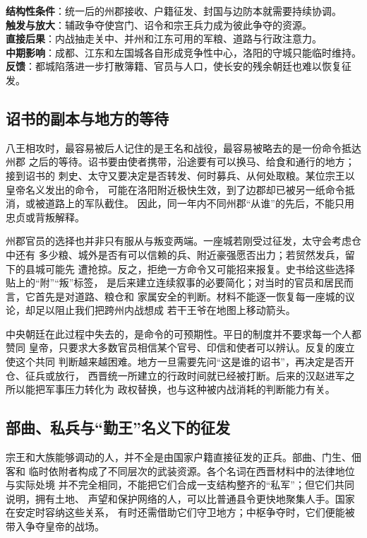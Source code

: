 \begin{causalchain}[西晋为何不能以一次复辟自救]
\textbf{结构性条件}：统一后的州郡接收、户籍征发、封国与边防本就需要持续协调。\\
\textbf{触发与放大}：辅政争夺使宫门、诏令和宗王兵力成为彼此争夺的资源。\\
\textbf{直接后果}：内战抽走关中、并州和江东可用的军粮、道路与行政注意力。\\
\textbf{中期影响}：成都、江东和左国城各自形成竞争性中心，洛阳的守城只能临时维持。\\
\textbf{反馈}：都城陷落进一步打散簿籍、官员与人口，使长安的残余朝廷也难以恢复征发。
\end{causalchain}

\subsection{诏书的副本与地方的等待}

八王相攻时，最容易被后人记住的是王名和战役，最容易被略去的是一份命令抵达州郡
之后的等待。诏书要由使者携带，沿途要有可以换马、给食和通行的地方；接到诏书的
刺史、太守又要决定是否转发、何时募兵、从何处取粮。某位宗王以皇帝名义发出的命令，
可能在洛阳附近极快生效，到了边郡却已被另一纸命令抵消，或被道路上的军队截住。
因此，同一年内不同州郡“从谁”的先后，不能只用忠贞或背叛解释。

州郡官员的选择也并非只有服从与叛变两端。一座城若刚受过征发，太守会考虑仓中还有
多少粮、城外是否有可以信赖的兵、附近豪强愿否出力；若贸然发兵，留下的县城可能先
遭抢掠。反之，拒绝一方命令又可能招来报复。史书给这些选择贴上的“附”“叛”标签，
是后来建立连续叙事的必要简化；对当时的官员和居民而言，它首先是对道路、粮仓和
家属安全的判断。材料不能逐一恢复每一座城的议论，却足以阻止我们把跨州内战想成
若干王爷在地图上移动箭头。

中央朝廷在此过程中失去的，是命令的可预期性。平日的制度并不要求每一个人都赞同
皇帝，只要求大多数官员相信某个官号、印信和使者可以辨认。反复的废立使这个共同
判断越来越困难。地方一旦需要先问“这是谁的诏书”，再决定是否开仓、征兵或放行，
西晋统一所建立的行政时间就已经被打断。后来的汉赵进军之所以能把军事压力转化为
政权替换，也与这种被内战消耗的判断能力有关。

\subsection{部曲、私兵与“勤王”名义下的征发}

宗王和大族能够调动的人，并不全是由国家户籍直接征发的正兵。部曲、门生、佃客和
临时依附者构成了不同层次的武装资源。各个名词在西晋材料中的法律地位与实际处境
并不完全相同，不能把它们合成一支结构整齐的“私军”；但它们共同说明，拥有土地、
声望和保护网络的人，可以比普通县令更快地聚集人手。国家在安定时容纳这些关系，
有时还需借助它们守卫地方；中枢争夺时，它们便能被带入争夺皇帝的战场。

